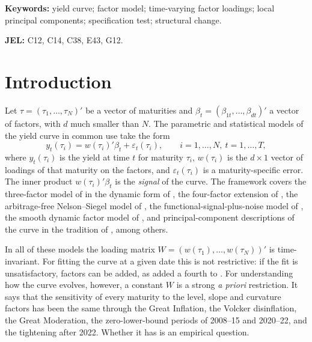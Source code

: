 \documentclass[11pt]{article}
\begin{document}
\noindent\textbf{Keywords:} yield curve; factor model; time-varying factor loadings; local principal components; specification test; structural change.

\noindent\textbf{JEL:} C12, C14, C38, E43, G12.

\section{Introduction}

Let $\tau=(\tau_1,\ldots,\tau_N)'$ be a vector of maturities and $\beta_t=(\beta_{1t},\ldots,\beta_{dt})'$ a vector of factors, with $d$ much smaller than $N$. The parametric and statistical models of the yield curve in common use take the form
\begin{equation}\label{eq.model}
  y_t(\tau_i) = w(\tau_i)'\beta_t + \varepsilon_t(\tau_i), \qquad i=1,\ldots,N,\ t=1,\ldots,T,
\end{equation}
where $y_t(\tau_i)$ is the yield at time $t$ for maturity $\tau_i$, $w(\tau_i)$ is the $d\times 1$ vector of loadings of that maturity on the factors, and $\varepsilon_t(\tau_i)$ is a maturity-specific error. The inner product $w(\tau_i)'\beta_t$ is the \emph{signal} of the curve. The framework covers the three-factor model of \citet{NelsonSiegel1987} in the dynamic form of \citet{DieboldLi2006}, the four-factor extension of \citet{Svensson1994}, the arbitrage-free Nelson--Siegel model of \citet{CDR2011}, the functional-signal-plus-noise model of \citet{BowsherMeeks2008}, the smooth dynamic factor model of \citet{JKV2014}, and principal-component descriptions of the curve in the tradition of \citet{LittermanScheinkman1991}, among others.

In all of these models the loading matrix $W=(w(\tau_1),\ldots,w(\tau_N))'$ is time-invariant. For fitting the curve at a given date this is not restrictive: if the fit is unsatisfactory, factors can be added, as \citet{Svensson1994} added a fourth to \citet{NelsonSiegel1987}. For understanding how the curve evolves, however, a constant $W$ is a strong \emph{a priori} restriction. It says that the sensitivity of every maturity to the level, slope and curvature factors has been the same through the Great Inflation, the Volcker disinflation, the Great Moderation, the zero-lower-bound periods of 2008--15 and 2020--22, and the tightening after 2022. Whether it has is an empirical question.
\end{document}
